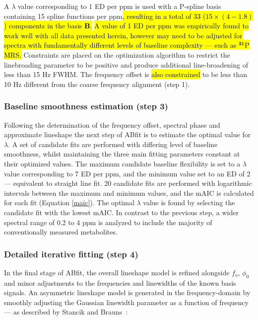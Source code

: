 \documentclass[num-refs]{wiley-article}
\newcommand{\revone}[2]{\hl{#1}\marginnote{\hl{#2}}}
\begin{document}
A $\lambda$ value corresponding to 1 ED per ppm is used with a P-spline basis containing 15 spline functions per ppm\revone{, resulting in a total of 33 ($15 \times (4 - 1.8)$) components in the basis \textbf{B}.}{R1.19} \revone{A value of 1 ED per ppm was empirically found to work well with all data presented herein, however may need to be adjusted for spectra with fundamentally different levels of baseline complexity --- such as $^{\textbf{31}}$P MRS.}{R1.19} Constraints are placed on the optimization algorithm to restrict the linebroading parameter to be positive and produce additional line-broadening of less than 15 Hz FWHM. The frequency offset is \revone{also constrained}{R1.20} to be less than 10 Hz different from the coarse frequency alignment (step 1).

\subsubsection{Baseline smoothness estimation (step 3)}
Following the determination of the frequency offset, spectral phase and approximate lineshape the next step of ABfit is to estimate the optimal value for $\lambda$. A set of candidate fits are performed with differing level of baseline smoothness, whilst maintaining the three main fitting parameters constant at their optimized values. The maximum candidate baseline flexibility is set to a $\lambda$ value corresponding to 7 ED per ppm, and the minimum value set to an ED of 2 --- equivalent to straight line fit. 20 candidate fits are performed with logarithmic intervals between the maximum and minimum values, and the mAIC is calculated for each fit (Equation \ref{maic}). The optimal $\lambda$ value is found by selecting the candidate fit with the lowest mAIC. In contrast to the previous step, a wider spectral range of 0.2 to 4 ppm is analyzed to include the majority of conventionally measured metabolites.

\subsubsection{Detailed iterative fitting (step 4)}
In the final stage of ABfit, the overall lineshape model is refined alongside $f_{o}$, $\phi_{0}$ and minor adjustments to the frequencies and linewidths of the known basis signals. An asymmetric lineshape model is generated in the frequency-domain by smoothly adjusting the Gaussian linewidth parameter as a function of frequency --- as described by Stancik and Brauns~\cite{Stancik2008}:
\end{document}
